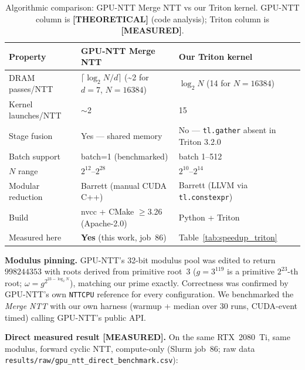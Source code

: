 \documentclass[11pt,a4paper]{article}
\begin{document}
\begin{table}[h]
\centering
\caption{Algorithmic comparison: GPU-NTT Merge NTT vs our Triton kernel.
GPU-NTT column is \textbf{[THEORETICAL]} (code analysis); Triton column is
\textbf{[MEASURED]}.}
\begin{tabular}{L{4.5cm}L{4.5cm}L{4.5cm}}
\toprule
Property & GPU-NTT Merge NTT & Our Triton kernel \\
\midrule
DRAM passes/NTT   & $\lceil \log_2 N / d \rceil$ (\textasciitilde2 for $d=7$, $N=16384$)
                  & $\log_2 N$ (14 for $N=16384$) \\
Kernel launches/NTT & $\sim$2 & 15 \\
Stage fusion      & Yes — shared memory & No — \texttt{tl.gather} absent in Triton 3.2.0 \\
Batch support     & batch=1 (benchmarked) & batch 1--512 \\
$N$ range         & $2^{12}$--$2^{28}$ & $2^{10}$--$2^{14}$ \\
Modular reduction & Barrett (manual CUDA C++) & Barrett (LLVM via \texttt{tl.constexpr}) \\
Build             & nvcc + CMake $\geq$3.26 (Apache-2.0) & Python + Triton \\
Measured here     & \textbf{Yes} (this work, job~86) & Table~\ref{tab:speedup_triton} \\
\bottomrule
\end{tabular}
\end{table}

\textbf{Modulus pinning.} GPU-NTT's 32-bit modulus pool was edited to return $998244353$
with roots derived from primitive root~3 ($g=3^{119}$ is a primitive $2^{23}$-th root;
$\omega=g^{2^{23-\log_2 N}}$), matching our prime exactly. Correctness was confirmed by GPU-NTT's
own \texttt{NTTCPU} reference for every configuration. We benchmarked the \emph{Merge NTT} with
our own harness (warmup + median over 30 runs, CUDA-event timed) calling GPU-NTT's public API.

\textbf{Direct measured result \textbf{[MEASURED]}.} On the same RTX~2080~Ti, same modulus,
forward cyclic NTT, compute-only (Slurm job~86; raw data
\texttt{results/raw/gpu\_ntt\_direct\_benchmark.csv}):
\end{document}
